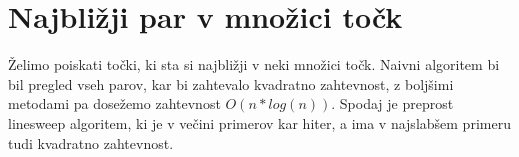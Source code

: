 \documentclass[10pt,a4paper,oneside]{book}
\begin{document}
\section{Najbližji par v množici točk}
Želimo poiskati točki, ki sta si najbližji v neki množici točk. Naivni algoritem bi bil pregled vseh parov, kar bi zahtevalo kvadratno zahtevnost, z boljšimi metodami pa dosežemo zahtevnost $O(n*log(n))$. Spodaj je preprost linesweep algoritem, ki je v večini primerov kar hiter, a ima v najslabšem primeru tudi kvadratno zahtevnost.


%

\end{document}

